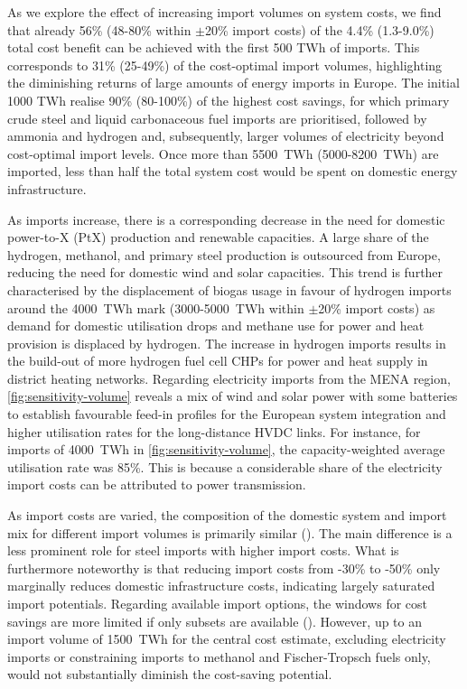 As we explore the effect of increasing import volumes on system costs, we find
that already 56\% (48-80\% within $\pm$20\% import costs) of the 4.4\%
(1.3-9.0\%) total cost benefit can be achieved with the first 500 TWh of
imports. This corresponds to 31\% (25-49\%) of the cost-optimal import volumes,
highlighting the diminishing returns of large amounts of energy imports in
Europe. The initial 1000 TWh realise 90\% (80-100\%) of the highest cost
savings, for which primary crude steel and liquid carbonaceous fuel imports are
prioritised, followed by ammonia and hydrogen and, subsequently, larger volumes
of electricity beyond cost-optimal import levels. Once more than 5500~TWh
(5000-8200~TWh) are imported, less than half the total system cost would be
spent on domestic energy infrastructure.

As imports increase, there is a corresponding decrease in the need for domestic
power-to-X (PtX) production and renewable capacities. A large share of the
hydrogen, methanol, and primary steel production is outsourced from Europe,
reducing the need for domestic wind and solar capacities. This trend is further
characterised by the displacement of biogas usage in favour of hydrogen imports
around the 4000~TWh mark (3000-5000~TWh within $\pm$20\% import costs) as demand
for domestic  utilisation drops and methane use for power and heat
provision is displaced by hydrogen. The increase in hydrogen imports results in
the build-out of more hydrogen fuel cell CHPs for power and heat supply in
district heating networks. Regarding electricity imports from the MENA region,
\cref{fig:sensitivity-volume} reveals a mix of wind and solar power with some
batteries to establish favourable feed-in profiles for the European system
integration and higher utilisation rates for the long-distance HVDC links. For
instance, for imports of 4000~TWh in \cref{fig:sensitivity-volume}, the
capacity-weighted average utilisation rate was 85\%. This is because a
considerable share of the electricity import costs can be attributed to power
transmission.

As import costs are varied, the composition of the domestic system and import
mix for different import volumes is primarily similar
().
The main difference is a less prominent role for steel imports with higher
import costs. What is furthermore noteworthy is that reducing import costs from
\mbox{-30\%} to \mbox{-50\%} only marginally reduces domestic infrastructure costs, indicating
largely saturated import potentials. Regarding available import options, the
windows for cost savings are more limited if only subsets are available
(). However, up to an import volume of 1500~TWh
for the central cost estimate, excluding electricity imports or constraining
imports to methanol and Fischer-Tropsch fuels only, would not substantially
diminish the cost-saving potential.

